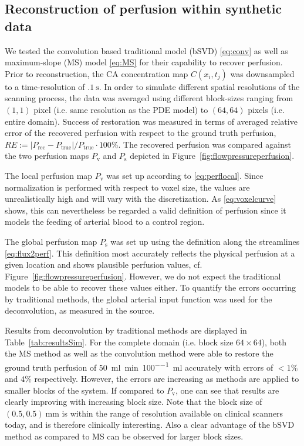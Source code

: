 \documentclass[journal,twocolumn]{IEEEtran}
\newcommand{\Perf}{P}
\newcommand{\Perfv}{P_{\mathrm{v}}}
\newcommand{\Perfs}{P_{\mathrm{s}}}
\newcommand{\siPml}{\milli\litre\per\minute\per100\milli\litre}
\begin{document}
	\subsection{Reconstruction of perfusion within synthetic data}\label{sec:RecPhantom}


	We tested the convolution based traditional model (bSVD) \eqref{eq:conv} as well as maximum-slope (MS) model \eqref{eq:MS} for their capability to recover perfusion.
	Prior to reconstruction, the CA concentration map $C(x_i,t_j)$ was downsampled to a time-resolution of $\SI{.1}{\second}$.
	In order to simulate different spatial resolutions of the scanning process, the data was averaged using different block-sizes ranging from $(1,1)$ pixel (i.e. same resolution as the PDE model) to $(64,64)$ pixels (i.e. entire domain).		
	Success of restoration was measured in terms of averaged relative error of the recovered perfusion with respect to the ground truth perfusion, $RE := \vert \Perf_{\mathrm{rec}} - \Perf_{\mathrm{true}}\vert/\Perf_{\mathrm{true}}\cdot 100\%$.
	The recovered perfusion was compared against the two perfusion maps $\Perfv$ and $\Perfs$ depicted in Figure~\ref{fig:flowpressureperfusion}.
	
	The local perfusion map $\Perfv$ was set up according to \eqref{eq:perflocal}. 
	Since normalization is performed with respect to voxel size, the values are unrealistically high and will vary with the discretization.
	As \eqref{eq:voxelcurve} shows, this can nevertheless be regarded a valid definition of perfusion since it models the feeding of arterial blood to a control region.
	
	The global perfusion map $\Perfs$ was set up using the definition along the streamlines \eqref{eq:flux2perf}.
	This definition most accurately reflects the physical perfusion at a given location and shows plausible perfusion values, cf. Figure~\ref{fig:flowpressureperfusion}.
	However, we do not expect the traditional models to be able to recover these values either.
	To quantify the errors occurring by traditional methods, the global arterial input function was used for the deconvolution, as measured in the source.
	
	Results from deconvolution by traditional methods are displayed in Table~\ref{tab:resultsSim}. 
	For the complete domain (i.e. block size $64 \times 64$), both the MS method as well as the convolution method were able to restore the ground truth perfusion of \SI{50}{\siPml} accurately with errors of $<1\%$ and $4\%$ respectively.
	However, the errors are increasing as methods are applied to smaller blocks of the system.
	If compared to $\Perfv$, one can see that results are clearly improving with increasing block size. Note that the block size of $(0.5,0.5)\SI{}{\milli\meter}$ is within the range of resolution available on clinical scanners today, and is therefore clinically interesting.
	Also a clear advantage of the bSVD method as compared to MS can be observed for larger block sizes.
		
\end{document}
